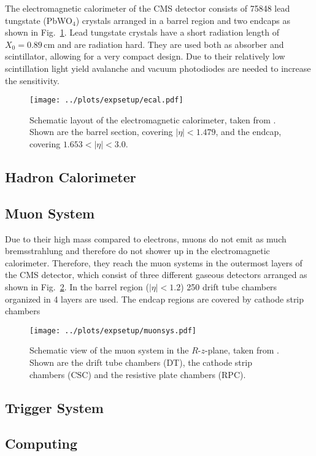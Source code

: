 \noindent The electromagnetic calorimeter of the CMS detector consists of 75848 lead tungstate (PbWO$_4$) crystals arranged in a barrel region and two endcaps as shown in Fig.~\ref{fig:expsetup:ecal}. Lead tungstate crystals have a short radiation length of $X_0=0.89$\,cm and are radiation hard. They are used both as absorber and scintillator, allowing for a very compact design. Due to their relatively low scintillation light yield avalanche and vacuum photodiodes are needed to increase the sensitivity. 
\begin{figure}
    \centering
    \texttt{[image: ../plots/expsetup/ecal.pdf]}
    \caption[Schematic layout of the electromagnetic calorimeter]{Schematic layout of the electromagnetic calorimeter, taken from \cite{CMS_design}. Shown are the barrel section, covering $|\eta|<1.479$, and the endcap, covering $1.653<|\eta|<3.0$. }
    \label{fig:expsetup:ecal}
\end{figure}
\subsection*{Hadron Calorimeter}
\subsection*{Muon System}
Due to their high mass compared to electrons, muons do not emit as much bremsstrahlung and therefore do not shower up in the electromagnetic calorimeter. Therefore, they reach the muon systems in the outermost layers of the CMS detector, which consist of three different gaseous detectors arranged as shown in Fig.~\ref{fig:expsetup:muonsys}. In the barrel region ($|\eta|<1.2$) 250 drift tube chambers organized in 4 layers are used. The endcap regions are covered by cathode strip chambers
\begin{figure}
    \centering
    \texttt{[image: ../plots/expsetup/muonsys.pdf]}
    \caption[Schematic view of the muon system in the $R$-$z$-plane]{Schematic view of the muon system in the $R$-$z$-plane, taken from \cite{CMS_design}. Shown are the drift tube chambers (DT), the cathode strip chambers (CSC) and the resistive plate chambers (RPC).}
    \label{fig:expsetup:muonsys}
\end{figure}
\subsection*{Trigger System}
\subsection*{Computing}
